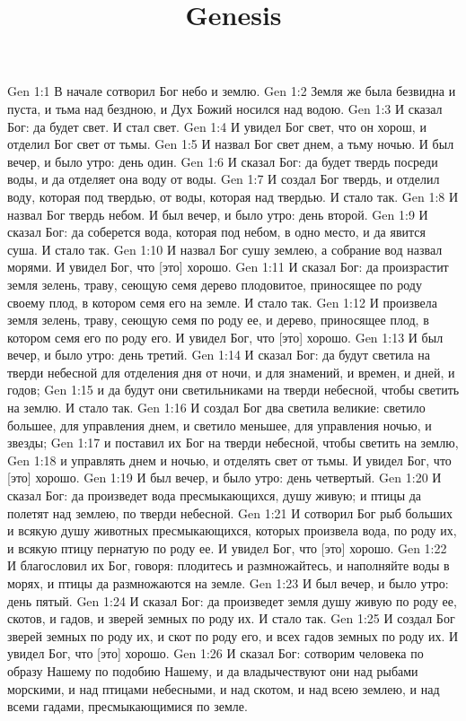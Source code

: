 

\title{Genesis}

Gen 1:1  В начале сотворил Бог небо и землю.
Gen 1:2  Земля же была безвидна и пуста, и тьма над бездною, и Дух Божий носился над водою.
Gen 1:3  И сказал Бог: да будет свет. И стал свет.
Gen 1:4  И увидел Бог свет, что он хорош, и отделил Бог свет от тьмы.
Gen 1:5  И назвал Бог свет днем, а тьму ночью. И был вечер, и было утро: день один.
Gen 1:6  И сказал Бог: да будет твердь посреди воды, и да отделяет она воду от воды.
Gen 1:7  И создал Бог твердь, и отделил воду, которая под твердью, от воды, которая над твердью. И стало так.
Gen 1:8  И назвал Бог твердь небом. И был вечер, и было утро: день второй.
Gen 1:9  И сказал Бог: да соберется вода, которая под небом, в одно место, и да явится суша. И стало так.
Gen 1:10  И назвал Бог сушу землею, а собрание вод назвал морями. И увидел Бог, что [это] хорошо.
Gen 1:11  И сказал Бог: да произрастит земля зелень, траву, сеющую семя дерево плодовитое, приносящее по роду своему плод, в котором семя его на земле. И стало так.
Gen 1:12  И произвела земля зелень, траву, сеющую семя по роду ее, и дерево, приносящее плод, в котором семя его по роду его. И увидел Бог, что [это] хорошо.
Gen 1:13  И был вечер, и было утро: день третий.
Gen 1:14  И сказал Бог: да будут светила на тверди небесной для отделения дня от ночи, и для знамений, и времен, и дней, и годов;
Gen 1:15  и да будут они светильниками на тверди небесной, чтобы светить на землю. И стало так.
Gen 1:16  И создал Бог два светила великие: светило большее, для управления днем, и светило меньшее, для управления ночью, и звезды;
Gen 1:17  и поставил их Бог на тверди небесной, чтобы светить на землю,
Gen 1:18  и управлять днем и ночью, и отделять свет от тьмы. И увидел Бог, что [это] хорошо.
Gen 1:19  И был вечер, и было утро: день четвертый.
Gen 1:20  И сказал Бог: да произведет вода пресмыкающихся, душу живую; и птицы да полетят над землею, по тверди небесной.
Gen 1:21  И сотворил Бог рыб больших и всякую душу животных пресмыкающихся, которых произвела вода, по роду их, и всякую птицу пернатую по роду ее. И увидел Бог, что [это] хорошо.
Gen 1:22  И благословил их Бог, говоря: плодитесь и размножайтесь, и наполняйте воды в морях, и птицы да размножаются на земле.
Gen 1:23  И был вечер, и было утро: день пятый.
Gen 1:24  И сказал Бог: да произведет земля душу живую по роду ее, скотов, и гадов, и зверей земных по роду их. И стало так.
Gen 1:25  И создал Бог зверей земных по роду их, и скот по роду его, и всех гадов земных по роду их. И увидел Бог, что [это] хорошо.
Gen 1:26  И сказал Бог: сотворим человека по образу Нашему по подобию Нашему, и да владычествуют они над рыбами морскими, и над птицами небесными, и над скотом, и над всею землею, и над всеми гадами, пресмыкающимися по земле.
